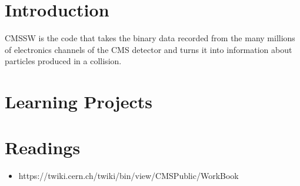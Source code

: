 \section{Introduction}
CMSSW is the code that takes the binary data recorded from the many
millions of electronics channels of the CMS detector and turns it
into information about particles produced in a collision.

\section{Learning Projects}


\section{Readings}
\begin{itemize}
\item https://twiki.cern.ch/twiki/bin/view/CMSPublic/WorkBook
\end{itemize}

